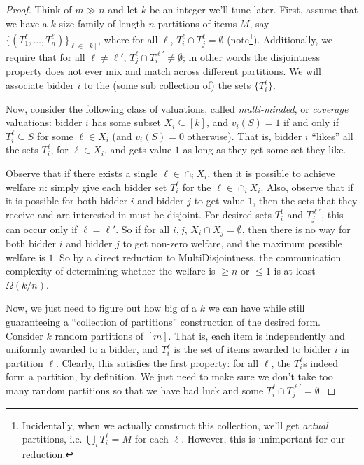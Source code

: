   \begin{proof}
    Think of $m \gg n$ and let $k$ be an integer we'll tune later.
    First, assume that we have
    a $k$-size family of length-$n$ partitions of items $M$, say
    $\{(T_1^\ell,\ldots, T_n^\ell)\}_{\ell \in [k]}$,
    where for all $\ell$, $T_i^\ell \cap T_j^\ell = \emptyset$ (note\footnote{
      Incidentally, when we actually construct this collection,
      we'll get \emph{actual} partitions, i.e. $\bigcup_i T_i^\ell = M$
      for each $\ell$.
      However, this is unimportant for our reduction.
    }).
    Additionally, we require that for
    all $\ell \neq \ell'$, $T_j^\ell \cap T_i^{\ell'} \neq \emptyset$;
    in other words the disjointness property does not ever mix and match
    across different partitions.
    We will associate bidder $i$ to the (some sub collection of) the sets
    $\{T^\ell_i\}$.

    Now, consider the following class of valuations, called \emph{multi-minded}, or
    \emph{coverage} valuations: bidder $i$ has some subset $X_i \subseteq [k]$, and
    $v_i(S) = 1$ if and only if $T_i^\ell \subseteq S$ for some $\ell \in X_i$ (and
    $v_i(S) = 0$ otherwise). That is, bidder $i$ ``likes'' all the sets $T_i^\ell$,
    for $\ell \in X_i$, and gets value $1$ as long as they get some set they like. 

    Observe that if there exists a single $\ell \in \cap_i X_i$, then it is possible
    to achieve welfare $n$: simply give each bidder set $T_i^\ell$ for the $\ell \in
    \cap_i X_i$. Also, observe that if it is possible for both bidder $i$ and bidder
    $j$ to get value $1$, then the sets that they receive and are interested in must
    be disjoint. For desired sets $T_i^\ell$ and $T_j^{\ell'}$, this can occur
    only if $\ell = \ell'$.
    So if for all $i, j$, $X_i \cap X_j = \emptyset$,
    then there is no way for both bidder $i$ and bidder $j$
    to get non-zero welfare, and the maximum possible welfare is $1$. So by a direct
    reduction to MultiDisjointness, the communication complexity of determining
    whether the welfare is $\geq n$ or $\leq 1$ is at least $\Omega(k/n)$. 

    Now, we just need to figure out how big of a $k$ we can have while still
    guaranteeing a ``collection of partitions''
    construction of the desired form. Consider $k$ random
    partitions of $[m]$. That is, each item is independently and uniformly awarded
    to a bidder, and $T_i^\ell$ is the set of items awarded to bidder $i$ in
    partition $\ell$. Clearly, this satisfies the first property: for all $\ell$,
    the $T_i^\ell$s indeed form a partition, by definition. We just need to make
    sure we don't take too many random partitions so that we have bad luck and some
    $T_i^\ell \cap T_j^{\ell'}= \emptyset$. 


\end{proof}
